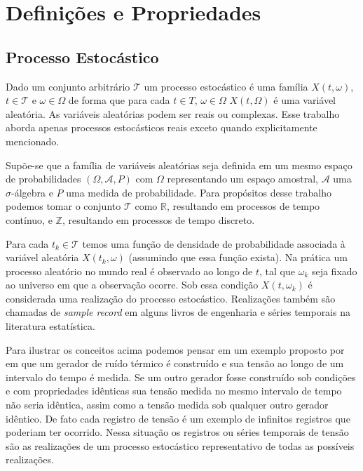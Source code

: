 \chapter{Definições e Propriedades}
\label{chap:teorica_classica_series_temporais_definicoes}

\section{Processo Estocástico}\label{sec:process}

Dado um conjunto arbitrário $\mathcal{T}$ um processo estocástico é uma família
${X(t,\omega)}$, $ t\in \mathcal{T}$ e $\omega \in \Omega$ de forma que para
cada $t \in T$, $\omega \in \Omega$ $X(t, \Omega)$ é uma variável aleatória. As
variáveis aleatórias podem ser reais ou complexas. Esse trabalho aborda apenas
processos estocásticos reais exceto quando explicitamente mencionado.

Supõe-se que a família de variáveis aleatórias seja definida em um mesmo
espaço de probabilidades $(\Omega, \mathcal{A}, P)$ com $\Omega$ representando
um espaço amostral, $\mathcal{A}$ uma $\sigma$-álgebra e $P$ uma medida de
probabilidade. Para propósitos desse trabalho podemos tomar o conjunto
$\mathcal{T}$ como $\mathbb{R}$, resultando em processos de tempo contínuo, e
$\mathbb{Z}$, resultando em processos de tempo discreto.

Para cada $t_k \in \mathcal{T}$ temos uma função de densidade de probabilidade
associada à variável aleatória $X(t_k, \omega)$ (assumindo que essa função exista).
Na prática um processo aleatório no mundo real é observado ao longo de $t$, tal que
$\omega_k$ seja fixado ao universo em que a observação ocorre. Sob essa condição
$X(t, \omega_k)$ é considerada uma realização do processo estocástico. Realizações também
são chamadas de \emph{sample record} em alguns livros de engenharia
e séries temporais na literatura estatística.

Para ilustrar os conceitos acima podemos pensar em um exemplo proposto por
~\cite{random_data} em que um gerador de ruído térmico é construído e sua tensão
ao longo de um intervalo do tempo é medida. Se um outro gerador fosse
construído sob condições e com propriedades idênticas sua tensão medida no
mesmo intervalo de tempo não seria idêntica, assim como a tensão medida sob
qualquer outro gerador idêntico. De fato cada registro de tensão é um exemplo
de infinitos registros que poderiam ter ocorrido. Nessa situação os registros
ou séries temporais de tensão são as realizações de um processo estocástico
representativo de todas as possíveis realizações.

